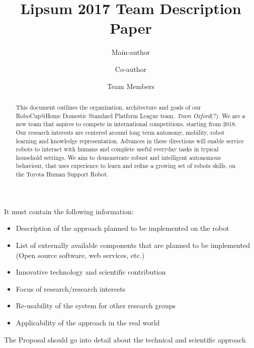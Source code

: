 \documentclass[runningheads,a4paper]{llncs}
\newcommand{\teamori}{Team Oxford}
\begin{document}
\title{Lipsum 2017 Team Description Paper}

\author{Main-author \and Co-author \and Team Members }
\maketitle



\begin{abstract}
This document outlines the organization, architecture and goals of our
RoboCup@Home Domestic Standard Platform League team, \textit{\teamori}(?). 
We are a new team that aspires to compete in international competitions,
starting from 2018. Our research interests are centered around long term
autonomy, mobility, robot learning and knowledge representation. 
Advances in these directions will enable service robots to interact with humans
and complete useful everyday tasks in typical household settings. 
We aim to demonstrate robust and intelligent autonomous behaviour, that uses
experience to learn and refine a growing set of robots skills, on the Toyota
Human Support Robot.

\end{abstract}



It must contain the following information:
\begin{itemize}
    \item Description of the approach planned to be implemented on the robot
    \item List of externally available components that are planned to be
    implemented (Open source software, web services, etc.)
    \item Innovative technology and scientific contribution
    \item Focus of research/research interests
    \item Re-usability of the system for other research groups
    \item Applicability of the approach in the real world
\end{itemize}
The Proposal should go into detail about the technical and scientific approach


\end{document}
